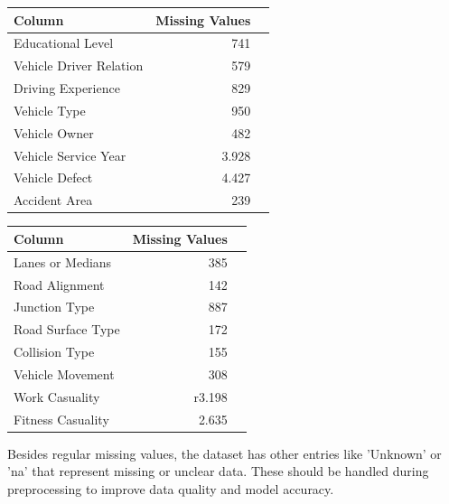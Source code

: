 \documentclass{article}
\begin{document}
\begin{table}[H]
    \parbox{.40\linewidth}{
        \begin{tabular}{l|r|c}
            \textbf{Column} & \textbf{Missing Values} \\\hline
            Educational Level & 741 \\
            Vehicle Driver Relation & 579\\
            Driving Experience & 829\\
            Vehicle Type & 950\\
            Vehicle Owner & 482\\
            Vehicle Service Year & 3.928\\
            Vehicle Defect & 4.427\\
            Accident Area & 239\\
        \end{tabular}
}
    \hfill
    \parbox{.40\linewidth}{
        \begin{tabular}{l|r|c}
           \textbf{Column} & \textbf{Missing Values} \\\hline
            Lanes or Medians & 385 \\
            Road Alignment & 142\\
            Junction Type & 887\\
            Road Surface Type & 172\\
            Collision Type & 155\\
            Vehicle Movement & 308\\
            Work Casuality & r3.198\\
            Fitness Casuality & 2.635\\
        \end{tabular}}
\end{table}

Besides regular missing values, the dataset has other entries like 'Unknown' or 'na' that represent missing or unclear data. These should be handled during preprocessing to improve data quality and model accuracy.
\end{document}
